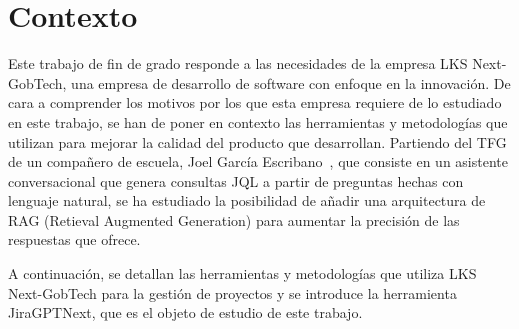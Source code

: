 \section{Contexto}

Este trabajo de fin de grado responde a las necesidades de la empresa LKS Next-GobTech, una empresa de desarrollo de software con enfoque en la innovación. De cara a comprender los motivos por los que esta empresa requiere de lo estudiado en este trabajo, se han de poner en contexto las herramientas y metodologías que utilizan para mejorar la calidad del producto que desarrollan. Partiendo del TFG de un compañero de escuela, Joel García Escribano~\cite{jiragpt}, que consiste en un asistente conversacional que genera consultas JQL a partir de preguntas hechas con lenguaje natural, se ha estudiado la posibilidad de añadir una arquitectura de RAG (Retieval Augmented Generation) para aumentar la precisión de las respuestas que ofrece.

A continuación, se detallan las herramientas y metodologías que utiliza LKS Next-GobTech para la gestión de proyectos y se introduce la herramienta JiraGPTNext, que es el objeto de estudio de este trabajo.




